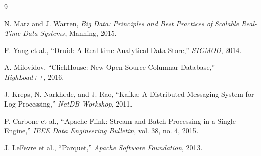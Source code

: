 \documentclass[11pt,twocolumn]{article}
\begin{document}
\begin{thebibliography}{9}

N. Marz and J. Warren, \textit{Big Data: Principles and Best Practices of Scalable Real-Time Data Systems}, Manning, 2015.

F. Yang et al., ``Druid: A Real-time Analytical Data Store,'' \textit{SIGMOD}, 2014.

A. Milovidov, ``ClickHouse: New Open Source Columnar Database,'' \textit{HighLoad++}, 2016.

J. Kreps, N. Narkhede, and J. Rao, ``Kafka: A Distributed Messaging System for Log Processing,'' \textit{NetDB Workshop}, 2011.

P. Carbone et al., ``Apache Flink: Stream and Batch Processing in a Single Engine,'' \textit{IEEE Data Engineering Bulletin}, vol. 38, no. 4, 2015.

J. LeFevre et al., ``Parquet,'' \textit{Apache Software Foundation}, 2013.

\end{thebibliography}
\end{document}
